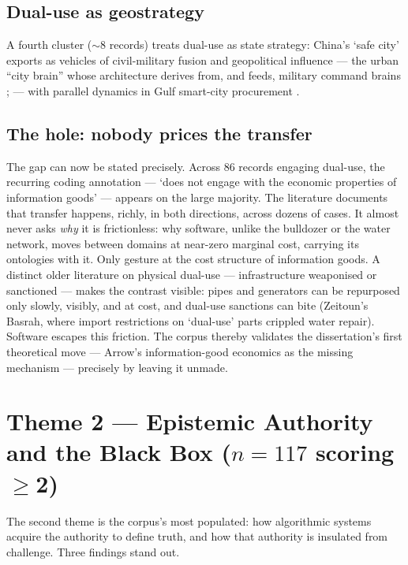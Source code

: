 \subsection{Dual-use as geostrategy}

A fourth cluster ($\sim$8 records) treats dual-use as state strategy: China's `safe city' exports as vehicles of civil-military fusion and geopolitical influence \parencite{weber2023} — the urban ``city brain'' whose architecture derives from, and feeds, military command brains \parencite[p.~18]{atha2020}; \parencite{robinson2020} — with parallel dynamics in Gulf smart-city procurement \parencite{ziadah2021}.

\subsection{The hole: nobody prices the transfer}

The gap can now be stated precisely. Across 86 records engaging dual-use, the recurring coding annotation — `does not engage with the economic properties of information goods' — appears on the large majority. The literature documents that transfer happens, richly, in both directions, across dozens of cases. It almost never asks \textit{why} it is frictionless: why software, unlike the bulldozer or the water network, moves between domains at near-zero marginal cost, carrying its ontologies with it. Only \textcite{amoore2009,wilhelmsen2022,srivastava2021} gesture at the cost structure of information goods. A distinct older literature on physical dual-use — infrastructure weaponised or sanctioned \parencite{salamanca2011,coward2009,zeitoun2018,coyles2017} — makes the contrast visible: pipes and generators can be repurposed only slowly, visibly, and at cost, and dual-use sanctions can bite (Zeitoun's Basrah, where import restrictions on `dual-use' parts crippled water repair). Software escapes this friction. The corpus thereby validates the dissertation's first theoretical move — Arrow's information-good economics as the missing mechanism — precisely by leaving it unmade.

\section{Theme 2 — Epistemic Authority and the Black Box (\texorpdfstring{$n=117$ scoring $\geq$2}{n=117 scoring ≥2})}
\label{sec:theme2}

The second theme is the corpus's most populated: how algorithmic systems acquire the authority to define truth, and how that authority is insulated from challenge. Three findings stand out.

